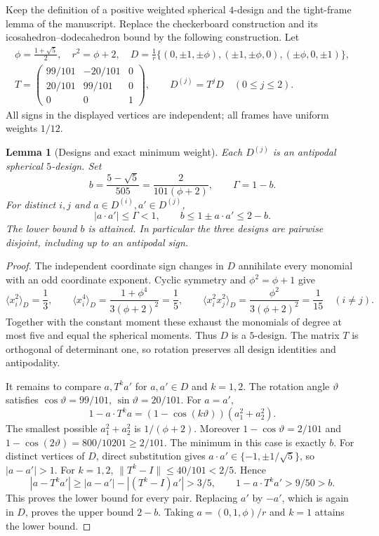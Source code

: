 \documentclass[11pt,reqno]{amsart}
\newtheorem{lemma}[theorem]{Lemma}
\theoremstyle{definition}
\begin{document}
Keep the definition of a positive weighted spherical $4$-design and the
tight-frame lemma of the manuscript. Replace the checkerboard construction
and its icosahedron--dodecahedron bound by the following construction.
Let
\begin{equation}\label{e:threeframes}
 \begin{gathered}
 \phi=\frac{1+\sqrt5}{2},\quad r^2=\phi+2,\quad
 D=\frac1r\{(0,\pm1,\pm\phi),(\pm1,\pm\phi,0),(\pm\phi,0,\pm1)\},\\
 T=\begin{pmatrix}99/101&-20/101&0\\20/101&99/101&0\\0&0&1\end{pmatrix},
 \qquad D^{(j)}=T^jD\quad(0\le j\le2).
 \end{gathered}
\end{equation}
All signs in the displayed vertices are independent; all frames have
uniform weights $1/12$.

\begin{lemma}[Designs and exact minimum weight]\label{l:threeframes}
Each $D^{(j)}$ is an antipodal spherical $5$-design. Set
\begin{equation}\label{e:delta}
 b=\frac{5-\sqrt5}{505}=\frac{2}{101(\phi+2)},\qquad \Gamma=1-b.
\end{equation}
For distinct $i,j$ and $a\in D^{(i)},a'\in D^{(j)}$,
\begin{equation}\label{e:separation}
 |a\cdot a'|\le\Gamma<1,\qquad b\le1\pm a\cdot a'\le2-b.
\end{equation}
The lower bound $b$ is attained. In particular the three designs are
pairwise disjoint, including up to an antipodal sign.
\end{lemma}
\begin{proof}
The independent coordinate sign changes in $D$ annihilate every monomial
with an odd coordinate exponent. Cyclic symmetry and $\phi^2=\phi+1$
give
\[
 \langle x_i^2\rangle_D=\frac13,\qquad
 \langle x_i^4\rangle_D=\frac{1+\phi^4}{3(\phi+2)^2}=\frac15,\qquad
 \langle x_i^2x_j^2\rangle_D=\frac{\phi^2}{3(\phi+2)^2}=\frac1{15}
 \quad(i\ne j).
\]
Together with the constant moment these exhaust the monomials of degree
at most five and equal the spherical moments. Thus $D$ is a $5$-design.
The matrix $T$ is orthogonal of determinant one, so rotation preserves
all design identities and antipodality.

It remains to compare $a,T^ka'$ for $a,a'\in D$ and $k=1,2$.
The rotation angle $\vartheta$ satisfies
$\cos\vartheta=99/101$, $\sin\vartheta=20/101$.
For $a=a'$,
\[
 1-a\cdot T^ka=(1-\cos(k\vartheta))(a_1^2+a_2^2).
\]
The smallest possible $a_1^2+a_2^2$ is $1/(\phi+2)$.
Moreover $1-\cos\vartheta=2/101$ and
$1-\cos(2\vartheta)=800/10201\ge2/101$.
The minimum in this case is exactly $b$.
For distinct vertices of $D$, direct substitution gives
$a\cdot a'\in\{-1,\pm1/\sqrt5\}$, so $|a-a'|>1$.
For $k=1,2$, $\|T^k-I\|\le40/101<2/5$. Hence
\[
 |a-T^ka'|\ge |a-a'|-|(T^k-I)a'|>3/5,
 \qquad 1-a\cdot T^ka'>9/50>b.
\]
This proves the lower bound for every pair. Replacing $a'$ by $-a'$,
which is again in $D$, proves the upper bound $2-b$.
Taking $a=(0,1,\phi)/r$ and $k=1$ attains the lower bound.
\end{proof}
\end{document}
